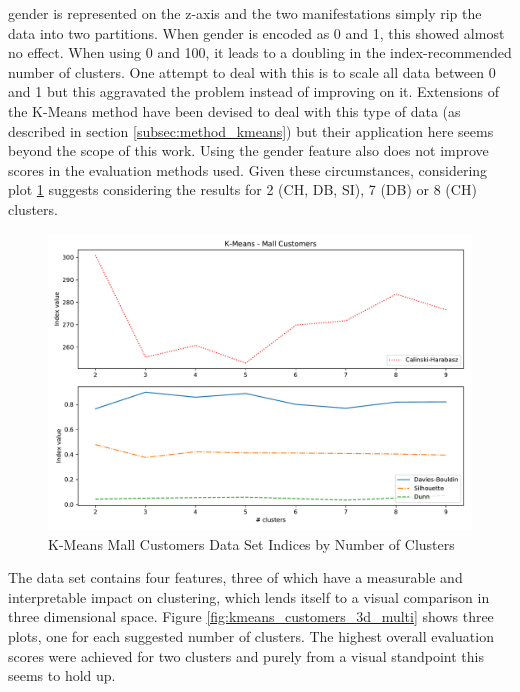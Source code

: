 gender is represented on the z-axis and the two manifestations simply rip the data into two partitions. When gender is encoded as 0 and 1, this showed almost no effect. When using 0 and 100, it leads to a doubling in the index-recommended number of clusters. One attempt to deal with this is to scale all data between 0 and 1 but this aggravated the problem instead of improving on it. Extensions of the K-Means method have been devised to deal with this type of data (as described in section \ref{subsec:method_kmeans}) but their application here seems beyond the scope of this work. Using the gender feature also does not improve scores in the evaluation methods used. Given these circumstances, considering plot \ref{fig:kmeans_customers_indices_plot} suggests considering the results for 2 (\gls{CH}, \gls{DB}, \gls{SI}), 7 (\gls{DB}) or 8 (\gls{CH}) clusters.

\begin{figure}[H]
\begin{center}
\includegraphics[width=1.0\textwidth]{images/kmeans_customers_index_plot.pdf}
\caption{K-Means Mall Customers Data Set Indices by Number of Clusters}
\end{center}
\label{fig:kmeans_customers_indices_plot}
\end{figure}


The data set contains four features, three of which have a measurable and interpretable impact on clustering, which lends itself to a visual comparison in three dimensional space. Figure \ref{fig:kmeans_customers_3d_multi} shows three plots, one for each suggested number of clusters. The highest overall evaluation scores were achieved for two clusters and purely from a visual standpoint this seems to hold up.

